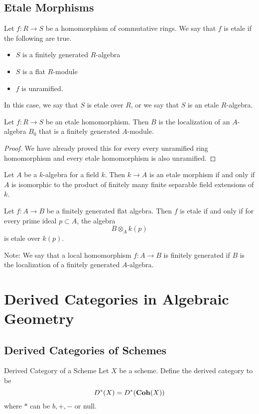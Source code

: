 \documentclass[a4paper]{article}
\begin{document}
\subsection{Etale Morphisms}
\begin{defn}{}{} Let $f:R\to S$ be a homomorphism of commutative rings. We say that $f$ is etale if the following are true. 
\begin{itemize}
\item $S$ is a finitely generated $R$-algebra
\item $S$ is a flat $R$-module
\item $f$ is unramified. 
\end{itemize}
In this case, we say that $S$ is etale over $R$, or we say that $S$ is an etale $R$-algebra. 
\end{defn}

\begin{crl}{}{} Let $f:R\to S$ be an etale homomorphism. Then $B$ is the localization of an $A$-algebra $B_0$ that is a finitely generated $A$-module. \tcbline
\begin{proof}
We have already proved this for every every unramified ring homomorphism and every etale homomorphism is also unramified. 
\end{proof}
\end{crl}

\begin{prp}{}{} Let $A$ be a $k$-algebra for a field $k$. Then $k\to A$ is an etale morphism if and only if $A$ is isomorphic to the product of finitely many finite separable field extensions of $k$. 
\end{prp}

\begin{prp}{}{} Let $f:A\to B$ be a finitely generated flat algebra. Then $f$ is etale if and only if for every prime ideal $p\subset A$, the algebra $$B\otimes_A k(p)$$ is etale over $k(p)$. 
\end{prp}

Note: We say that a local homomorphism $f:A\to B$ is finitely generated if $B$ is the localization of a finitely generated $A$-algebra. 


\pagebreak
\section{Derived Categories in Algebraic Geometry}
\subsection{Derived Categories of Schemes}
\begin{defn}{Derived Category of a Scheme}{} Let $X$ be a scheme. Define the derived category to be $$D^\ast(X)=D^\ast(\bold{Coh}(X))$$ where $\ast$ can be $b,+,-$ or null. 
\end{defn}
\end{document}
